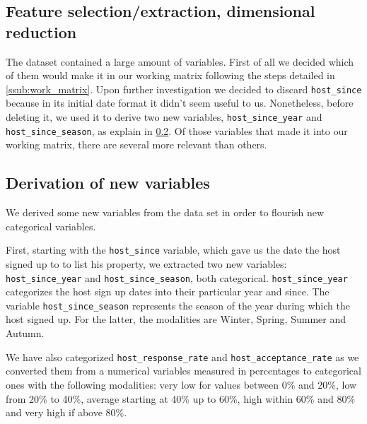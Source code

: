 \subsection{Feature selection/extraction, dimensional reduction}

The \airbnb dataset contained a large amount of variables. First of all we
decided which of them would make it in our working matrix following the steps
detailed in \ref{ssub:work_matrix}. Upon further investigation we decided to
discard \texttt{host\_since} because in its initial date format it didn't
seem useful to us. Nonetheless, before deleting it, we used it to derive two
new variables, \texttt{host\_since\_year} and \texttt{host\_since\_season},
as explain in \ref{ssub:variable_derivation}.
Of those variables that made it into our working matrix, there are several
more relevant than others.

\begin{comment} %

\subsubsection{Instance selection}

\subsubsection{Data transformation}

\end{comment}

\pagebreak
\subsection{Derivation of new variables}
\label{ssub:variable_derivation}

We derived some new variables from the data set in order to flourish new
categorical variables.

First, starting with the \texttt{host\_since} variable, which gave us the date
the host signed up to \airbnb to list his property, we extracted two new
variables: \texttt{host\_since\_year} and \texttt{host\_since\_season}, both
categorical. \texttt{host\_since\_year} categorizes the host sign up dates into
their particular year and since. The variable \texttt{host\_since\_season}
represents the season of the year during which the host signed up. For the
latter, the modalities are Winter, Spring, Summer and Autumn.

We have also categorized \texttt{host\_response\_rate} and
\texttt{host\_acceptance\_rate} as we converted them from a numerical
variables
measured in percentages to categorical ones with the following
modalities: very
low for values between 0\% and 20\%, low from 20\% to 40\%, average
starting at 40\% up to 60\%, high within 60\% and 80\% and very high if
above 80\%.

